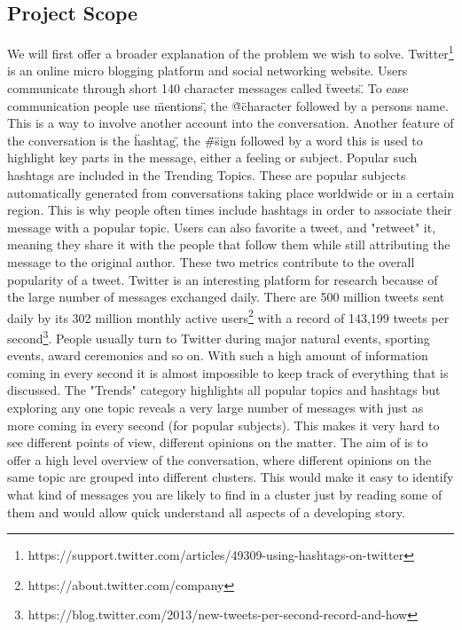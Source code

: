 \subsection{Project Scope}
\label{sub-sec:proj-scope}

We will first offer a broader explanation of the problem we wish to solve.
\newline
Twitter\footnote{https://support.twitter.com/articles/49309-using-hashtags-on-twitter} is an online micro blogging platform and social networking website. Users communicate through short 140 character messages called \"tweets\". To ease communication people use \"mentions\", the \"@\" character followed by a persons name. This is a way to involve another account into the conversation. Another feature of the conversation is the \"hashtag\", the \"\#\" sign followed by a word this is used to highlight key parts in the message, either a feeling or subject. Popular such hashtags are included in the Trending Topics. These are popular subjects automatically generated from conversations taking place worldwide or in a certain region. This is why people often times include hashtags in order to associate their message with a popular topic. Users can also favorite a tweet, and "retweet" it, meaning they share it with the people that follow them while still attributing the message to the original author. These two metrics contribute to the overall popularity of a tweet.
\newline
Twitter is an interesting platform for research because of the large number of messages exchanged daily. There are 500 million tweets sent daily by its 302 million monthly active users\footnote{https://about.twitter.com/company} with a record of 143,199 tweets per second\footnote{https://blog.twitter.com/2013/new-tweets-per-second-record-and-how}. People usually turn to Twitter during major natural events, sporting events, award ceremonies and so on. With such a high amount of information coming in every second it is almost impossible to keep track of everything that is discussed.
\newline
The "Trends" category highlights all popular topics and hashtags but exploring any one topic reveals a very large number of messages with just as more coming in every second (for popular subjects). This makes it very hard to see different points of view, different opinions on the matter. The aim of {\project}  is to offer a high level overview of the conversation, where different opinions on the same topic are grouped into different clusters. This would make it easy to identify what kind of messages you are likely to find in a cluster just by reading some of them and would allow quick understand all aspects of a developing story.
